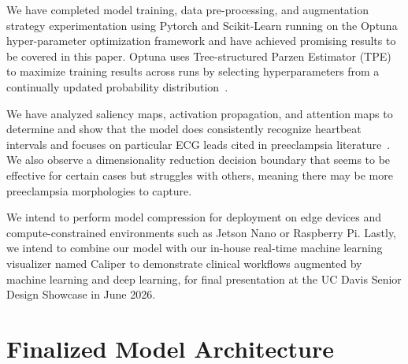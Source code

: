 \documentclass[sigconf,nonacm]{acmart}
\begin{document}
We have completed model training, data pre-processing, and augmentation strategy experimentation using Pytorch and Scikit-Learn running on the Optuna hyper-parameter optimization framework and have achieved promising results to be covered in this paper. Optuna uses Tree-structured Parzen Estimator (TPE) to maximize training results across runs by selecting hyperparameters from a continually updated probability distribution~\cite{akiba_optuna_2019}.

We have analyzed saliency maps, activation propagation, and attention maps to determine and show that the model does consistently recognize heartbeat intervals and focuses on particular ECG leads cited in preeclampsia literature~\cite{aboshady_qtc_2025}. We also observe a dimensionality reduction decision boundary that seems to be effective for certain cases but struggles with others, meaning there may be more preeclampsia morphologies to capture.

We intend to perform model compression for deployment on edge devices and compute-constrained environments such as Jetson Nano or Raspberry Pi.
Lastly, we intend to combine our model with our in-house real-time machine learning visualizer named Caliper to demonstrate clinical workflows augmented by machine learning and deep learning, for final presentation at the UC Davis Senior Design Showcase in June 2026.


\section{Finalized Model Architecture}
\label{sec:arch}
\end{document}
